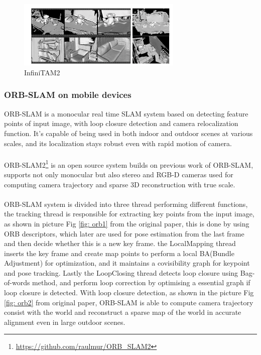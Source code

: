 \documentclass[12pt,twoside]{article}
\begin{document}
\begin{figure}[h]
    \centering
    \includegraphics[width=0.7\textwidth]{figures/InfiniTAM2}
    \caption{InfiniTAM2}
    \label{fig: InfiniTAM2}
\end{figure}


\subsubsection{ORB-SLAM on mobile devices}
ORB-SLAM is a monocular real time SLAM system based on detecting feature points of input image, with loop closure detection and camera relocalization function. It's capable of being used in both indoor and outdoor scenes at various scales, and its localization stays robust even with rapid motion of camera.\\
\\
ORB-SLAM2\citep{mur2016orb}\footnote{\url{https://github.com/raulmur/ORB_SLAM2}} is an open source system builds on previous work of ORB-SLAM, supports not only monocular but also stereo and RGB-D cameras used for computing camera trajectory and sparse 3D reconstruction with true scale.\\
\\
ORB-SLAM system is divided into three thread performing different functions, the tracking thread is responsible for extracting key points from the input image, as shown in picture Fig \ref{fig: orb1} from the original paper, this is done by using ORB descriptors, which later are used for pose estimation from the last frame and then decide whether this is a new key frame. the LocalMapping thread inserts the key frame and create map points to perform a local BA(Bundle Adjustment) for optimization, and it maintains a covisibility graph for keypoint and pose tracking. Lastly the LoopClosing thread detects loop closure using Bag-of-words method\citep{galvez2012bags}, and perform loop correction by optimising a essential graph if loop closure is detected. With loop closure detection, as shown in the picture Fig \ref{fig: orb2} from original paper, ORB-SLAM is able to compute camera trajectory consist with the world and reconstruct a sparse map of the world in accurate alignment even in large outdoor scenes.\\
\end{document}
